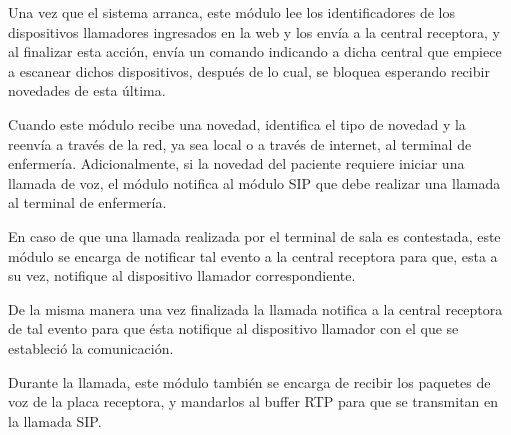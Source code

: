 Una vez que el sistema arranca, este módulo lee los identificadores de los dispositivos llamadores ingresados en la web y los envía a la central receptora, y al finalizar esta acción, envía un comando indicando a dicha central que empiece a escanear dichos dispositivos, después de lo cual, se bloquea esperando recibir novedades de esta última.

Cuando este módulo recibe una novedad, identifica el tipo de novedad y la reenvía a través de la red, ya sea local o a través de internet, al terminal de enfermería. Adicionalmente, si la novedad del paciente requiere iniciar una llamada de voz, el módulo notifica al módulo SIP que debe realizar una llamada al terminal de enfermería.

En caso de que una llamada realizada por el terminal de sala es contestada, este módulo se encarga de notificar tal evento a la central receptora para que, esta a su vez, notifique al dispositivo llamador correspondiente.

De la misma manera una vez finalizada la llamada notifica a la central receptora de tal evento para que ésta notifique al dispositivo llamador con el que se estableció la comunicación.

Durante la llamada, este módulo también se encarga de recibir los paquetes de voz de la placa receptora, y mandarlos al buffer RTP para que se transmitan en la llamada SIP.
